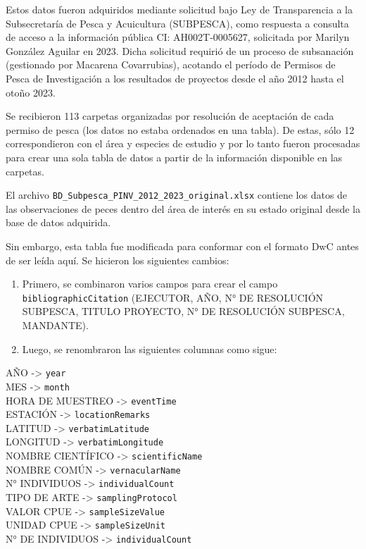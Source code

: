 \documentclass[sn-apa,pdflatex]{sn-jnl}
\begin{document}
Estos datos fueron adquiridos mediante solicitud bajo Ley de
Transparencia a la Subsecretaría de Pesca y Acuicultura (SUBPESCA), como
respuesta a consulta de acceso a la información pública CI:
AH002T-0005627, solicitada por Marilyn González Aguilar en 2023. Dicha
solicitud requirió de un proceso de subsanación (gestionado por Macarena
Covarrubias), acotando el período de Permisos de Pesca de Investigación
a los resultados de proyectos desde el año 2012 hasta el otoño 2023.

Se recibieron 113 carpetas organizadas por resolución de aceptación de
cada permiso de pesca (los datos no estaba ordenados en una tabla). De
estas, sólo 12 correspondieron con el área y especies de estudio y por
lo tanto fueron procesadas para crear una sola tabla de datos a partir
de la información disponible en las carpetas.

El archivo \texttt{BD\_Subpesca\_PINV\_2012\_2023\_original.xlsx}
contiene los datos de las observaciones de peces dentro del área de
interés en su estado original desde la base de datos adquirida.

Sin embargo, esta tabla fue modificada para conformar con el formato DwC
antes de ser leída aquí. Se hicieron los siguientes cambios:

\begin{enumerate}
\def\labelenumi{\arabic{enumi}.}
\item
  Primero, se combinaron varios campos para crear el campo
  \texttt{bibliographicCitation} (EJECUTOR, AÑO, N° DE RESOLUCIÓN
  SUBPESCA, TITULO PROYECTO, N° DE RESOLUCIÓN SUBPESCA, MANDANTE).
\item
  Luego, se renombraron las siguientes columnas como sigue:
\end{enumerate}

AÑO -\textgreater{} \texttt{year}\\
MES -\textgreater{} \texttt{month}\\
HORA DE MUESTREO -\textgreater{} \texttt{eventTime}\\
ESTACIÓN -\textgreater{} \texttt{locationRemarks}\\
LATITUD -\textgreater{} \texttt{verbatimLatitude}\\
LONGITUD -\textgreater{} \texttt{verbatimLongitude}\\
NOMBRE CIENTÍFICO -\textgreater{} \texttt{scientificName}\\
NOMBRE COMÚN -\textgreater{} \texttt{vernacularName}\\
N° INDIVIDUOS -\textgreater{} \texttt{individualCount}\\
TIPO DE ARTE -\textgreater{} \texttt{samplingProtocol}\\
VALOR CPUE -\textgreater{} \texttt{sampleSizeValue}\\
UNIDAD CPUE -\textgreater{} \texttt{sampleSizeUnit}\\
N° DE INDIVIDUOS -\textgreater{} \texttt{individualCount}
\end{document}
